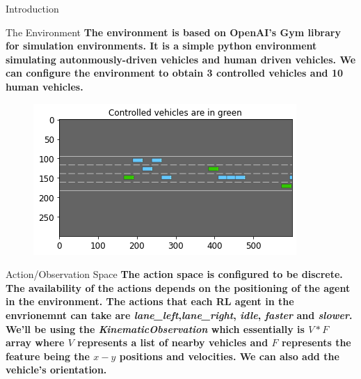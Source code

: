 \documentclass[final]{beamer}
\newlength{\onecolwid}
\begin{document}
\begin{frame}[t]
\begin{columns}[t]
\begin{column}{\onecolwid}
\begin{block}{Introduction}
\end{block}
          
\begin{block}{The Environment}
\textbf{The environment is based on OpenAI's Gym library for simulation environments. It is a simple python environment
    simulating autonmously-driven vehicles and human driven vehicles. We can configure the environment to obtain 3 controlled vehicles
    and 10 human vehicles. 
}

\begin{figure}
\vspace*{0.2cm}
\includegraphics[width=0.6\linewidth]{images/highway-env.png}
\end{figure}

\end{block}    
          
\begin{block}{Action/Observation Space}
\textbf{The action space is configured to be discrete. The availability of the actions depends on the positioning of the agent
    in the environment. The actions that each RL agent in the envrionemnt can take are \textit{lane\_left},\textit{lane\_right},
    \textit{idle}, \textit{faster} and \textit{slower}.}
\textbf{We'll be using the \textit{KinematicObservation} which essentially is  $V*F$  array where $V$  
represents a list of nearby vehicles and $F$ represents the feature being the $x-y$  
positions and velocities. We can also add the vehicle's orientation. 
}


\end{block}
\end{column}
\end{columns}
\end{frame}
\end{document}
